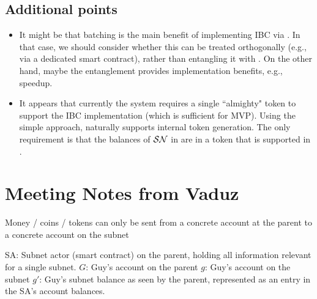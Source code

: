 \subsection{Additional points}
\begin{itemize}
    \item It might be that batching is the main benefit of implementing IBC via \hc. In that case, we should consider whether this can be treated orthogonally (e.g., via a dedicated smart contract), rather than entangling it with \hc. On the other hand, maybe the entanglement provides implementation benefits, e.g., speedup. 
    \item It appears that currently the system requires a single ``almighty" token to support the IBC implementation (which is sufficient for MVP). Using the simple approach, naturally supports internal token generation. The only requirement is that the balances of $\SN$ in \parent{$\SN$} are in a token that is supported in \parent{$\SN$}.
\end{itemize}

\section{Meeting Notes from Vaduz}

Money / coins / tokens can only be sent from a concrete account at the parent to a concrete account on the subnet

SA: Subnet actor (smart contract) on the parent, holding all information relevant for a single subnet.
$G$: Guy's account on the parent
$g$: Guy's account on the subnet
$g'$: Guy's subnet balance as seen by the parent, represented as an entry in the SA's account balances.

